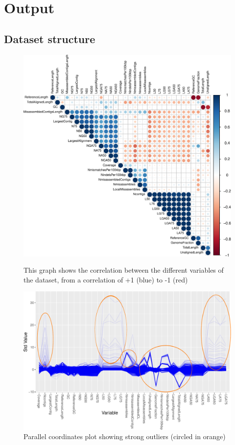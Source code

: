 \documentclass[11pt, a4paper,titlepage]{article}
\begin{document}
\section{Output}
\subsection{Dataset structure}

\begin{figure}[H]
  \centering
  \includegraphics[scale=0.6]{corrplot-crop.pdf}
  \caption{This graph shows the correlation between the different
    variables of the dataset, from a correlation of +1 (blue) to -1
    (red)}
  \label{fig:corrplot}
  \includegraphics[scale=0.6]{parcoord.pdf}
  \caption{Parallel coordinates plot showing strong outliers (circled
    in orange)}
  \label{fig:parcoord}
\end{figure}
\end{document}
